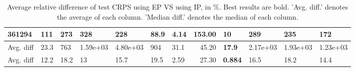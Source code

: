 \begin{table}[ht!]
\begin{tabular}{lllllllrllll}
  361294 & 111 & 273 & 328 & 228 & 88.9 & \textbf{4.14} & 153.00 & 10 & 289 & 235 & 172 \\ 
   \hline
Avg. diff & 23.3 & 763 &  1.59e+03 &  4.80e+03 & 904 & 31.1 & 45.20 & \textbf{17.9} &  2.17e+03 &  1.93e+03 &  1.23e+03 \\ 
  Avg. diff & 12.2 & 18.2 & 13 & 15.7 & 19.5 & 2.59 & 27.30 & \textbf{0.884} & 16.5 & 18.2 & 14.4 \\ 
   \hline
\hline
\end{tabular}
\endgroup
\caption{Average relative difference of test CRPS using EP VS using IP, in \%. 
                  Best results are bold. 
                  'Avg. diff.' denotes the average of each column.
                  'Median diff.' denotes the median of each column.} 
\label{TABLES/table_results_CRPS_num_and_cat_features_EP_VS_IP}
\end{table}

